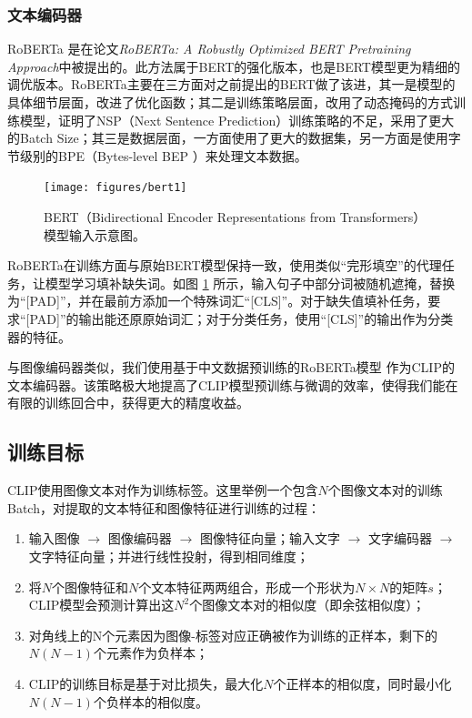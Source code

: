 \documentclass[a4paper]{zreport}
\begin{document}
\subsubsection{文本编码器}

RoBERTa \cite{roberta} 是在论文\emph{RoBERTa: A Robustly Optimized BERT Pretraining Approach}中被提出的。此方法属于BERT的强化版本，也是BERT模型更为精细的调优版本。RoBERTa主要在三方面对之前提出的BERT做了该进，其一是模型的具体细节层面，改进了优化函数；其二是训练策略层面，改用了动态掩码的方式训练模型，证明了NSP（Next Sentence Prediction）训练策略的不足，采用了更大的Batch Size；其三是数据层面，一方面使用了更大的数据集，另一方面是使用字节级别的BPE（Bytes-level BEP ）来处理文本数据。

\begin{figure}[h]
\centering
\texttt{[image: figures/bert1]}
\caption{BERT（Bidirectional Encoder Representations from Transformers）模型输入示意图。}
\label{fig:bert1}
\end{figure}

RoBERTa在训练方面与原始BERT模型保持一致，使用类似“完形填空”的代理任务，让模型学习填补缺失词。如图 \ref{fig:bert1} 所示，输入句子中部分词被随机遮掩，替换为“[PAD]”，并在最前方添加一个特殊词汇“[CLS]”。对于缺失值填补任务，要求“[PAD]”的输出能还原原始词汇；对于分类任务，使用“[CLS]”的输出作为分类器的特征。

与图像编码器类似，我们使用基于中文数据预训练的RoBERTa模型 \cite{cn-roberta} 作为CLIP的文本编码器。该策略极大地提高了CLIP模型预训练与微调的效率，使得我们能在有限的训练回合中，获得更大的精度收益。


\subsection{训练目标}

CLIP使用图像文本对作为训练标签。这里举例一个包含$N$个图像文本对的训练Batch，对提取的文本特征和图像特征进行训练的过程：

\begin{enumerate}
\item 输入图像 $\rightarrow$ 图像编码器 $\rightarrow$ 图像特征向量；输入文字 $\rightarrow$ 文字编码器 $\rightarrow$ 文字特征向量；并进行线性投射，得到相同维度；
\item 将$N$个图像特征和$N$个文本特征两两组合，形成一个形状为$N \times N$的矩阵$s$；
CLIP模型会预测计算出这$N^2$个图像文本对的相似度（即余弦相似度）；
\item 对角线上的N个元素因为图像-标签对应正确被作为训练的正样本，剩下的$N(N-1)$个元素作为负样本；
\item CLIP的训练目标是基于对比损失，最大化$N$个正样本的相似度，同时最小化$N(N-1)$个负样本的相似度。
\end{enumerate}
\end{document}
